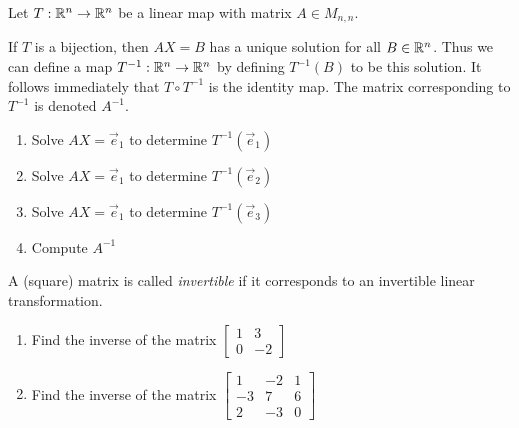 
\begin{applicationActivities}{3}{24}

\begin{activity}{0}
  Let $T: \mathbb{R}^n \rightarrow \mathbb{R}^n$ be a linear map with matrix $A \in M_{n,n}$.

  If $T$ is a bijection, then $AX=B$ has a unique solution for all $B \in \mathbb{R}^n$.  Thus we can define a map $T^{-1} : \mathbb{R}^n \rightarrow \mathbb{R}^n$ by defining $T^{-1}(B)$ to be this solution.  It follows immediately that $T \circ T^{-1}$ is the identity map.  The matrix corresponding to $T^{-1}$ is denoted $A^{-1}$.

  \begin{enumerate}[1)]
  \item Solve $AX=\vec{e}_1$ to determine $T^{-1}(\vec{e}_1)$
  \item Solve $AX=\vec{e}_1$ to determine $T^{-1}(\vec{e}_2)$
  \item Solve $AX=\vec{e}_1$ to determine $T^{-1}(\vec{e}_3)$
  \item Compute $A^{-1}$
  \end{enumerate}

  A (square) matrix is called {\em invertible} if it corresponds to an invertible linear transformation.

  \begin{enumerate}[1)]
  \item Find the inverse of the matrix $\begin{bmatrix} 1 & 3 \\ 0 & -2 \end{bmatrix}$
  \item Find the inverse of the matrix $\begin{bmatrix} 1 & -2 & 1 \\ -3 & 7 & 6 \\ 2 & -3 & 0 \end{bmatrix}$
  \end{enumerate}
\end{activity}

\end{applicationActivities}
